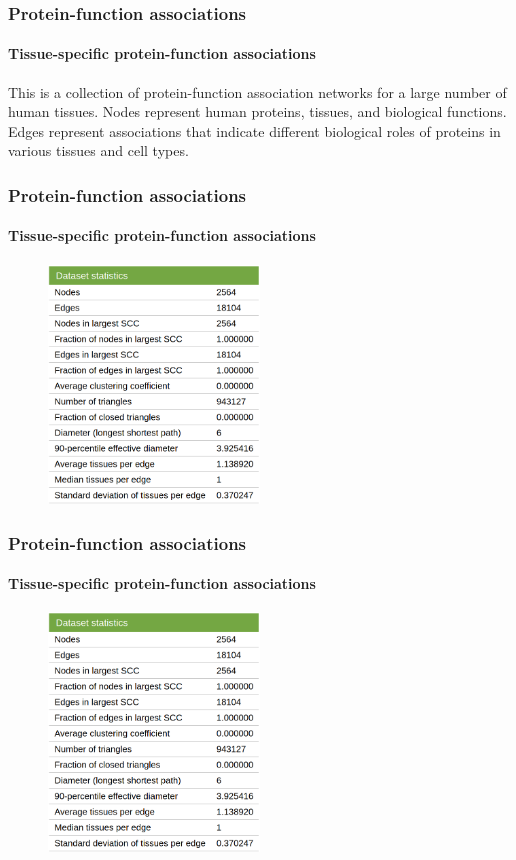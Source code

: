 \documentclass[aspectratio=43,leqno]{beamer}
\begin{document}
\begin{frame}
  \frametitle{Protein-function associations}
  \framesubtitle{Tissue-specific protein-function associations}

  This is a collection of protein-function association networks for a large number of human tissues. Nodes represent human proteins, tissues, and biological functions. Edges represent associations that indicate different biological roles of proteins in various tissues and cell types.

\end{frame}

\begin{frame}
  \frametitle{Protein-function associations}
  \framesubtitle{Tissue-specific protein-function associations}

    \begin{figure}[h]
    \centering
    \includegraphics[width=0.5\textwidth]{images/tfg.png}
    \label{fig:mesh1}
  \end{figure}
  
\end{frame}

\begin{frame}
  \frametitle{Protein-function associations}
  \framesubtitle{Tissue-specific protein-function associations}

    \begin{figure}[h]
    \centering
    \includegraphics[width=0.5\textwidth]{images/tfg.png}
    \label{fig:mesh1}
  \end{figure}
  
\end{frame}
\end{document}
